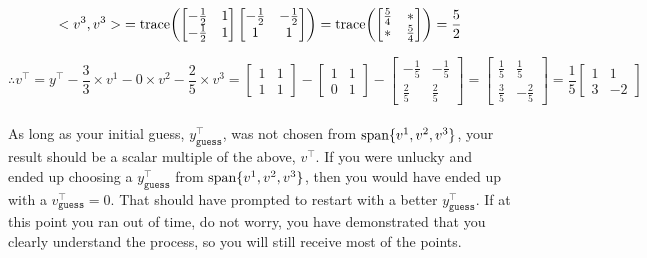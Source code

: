 \documentclass[letterpaper]{article}
\begin{document}
\begin{enumerate}
$${<v^3, v^3>} = \mathrm{trace}{\left(\begin{bmatrix} -\frac{1}{2} & 1 \\ -\frac{1}{2}  & 1 \end{bmatrix} \begin{bmatrix}-\frac{1}{2} & -\frac{1}{2} \\ 1  & 1 \end{bmatrix}\right)} = \mathrm{trace}{\left(\begin{bmatrix}\frac{5}{4} & * \\ * & \frac{5}{4} \end{bmatrix}\right)}= \frac{5}{2}$$

$$\therefore v^\top = y^\top - \dfrac{3}{3} \times v^1 - 0 \times v^2 - \dfrac{2}{5} \times v^3 = \begin{bmatrix}1 & 1 \\ 1 & 1 \end{bmatrix}- \begin{bmatrix} 1 & 1 \\ 0  & 1  \end{bmatrix}- \begin{bmatrix}-\frac{1}{5} & -\frac{1}{5} \\[0.5em] \frac{2}{5} & \frac{2}{5} \end{bmatrix} =  \begin{bmatrix} \frac{1}{5} & \frac{1}{5} \\[0.5em] \frac{3}{5} & -\frac{2}{5}  \end{bmatrix}= \frac{1}{5}\begin{bmatrix}1 &1 \\[0.5em]3 & -2  \end{bmatrix} $$\\

As long as your initial guess, $y^\top_{\mathtt{guess}}$, was not chosen from $\textrm{span} \{ v^1, v^2, v^3 \}$, your result should be a scalar multiple of the above, $v^\top$. If you were unlucky and ended up choosing a $y^\top_{\mathtt{guess}}$ from $\textrm{span} \{ v^1, v^2, v^3 \}$, then you would have ended up with a $v^\top_{\mathtt{guess}} = 0$. That should have prompted to restart with a better $y^\top_{\mathtt{guess}}$. If at this point you ran out of time, do not worry, you have demonstrated that you clearly understand the process, so you will still receive most of the points.


\end{enumerate}
\end{document}
